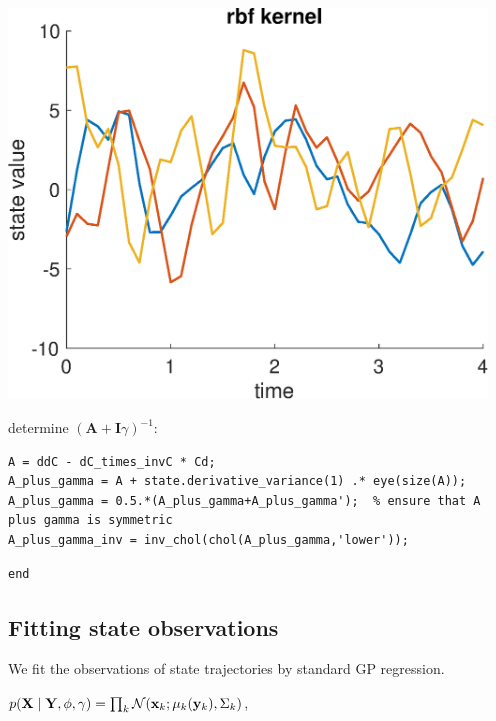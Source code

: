 \includegraphics [width=5in]{Lotka_Volterra_3_04.eps}
\begin{par}
determine $(\mathbf{A} + \mathbf{I}\gamma)^{-1}$:
\end{par} \vspace{1em}
\color{RoyalPurple}\begin{verbatim}
A = ddC - dC_times_invC * Cd;
A_plus_gamma = A + state.derivative_variance(1) .* eye(size(A));
A_plus_gamma = 0.5.*(A_plus_gamma+A_plus_gamma');  % ensure that A plus gamma is symmetric
A_plus_gamma_inv = inv_chol(chol(A_plus_gamma,'lower'));
\end{verbatim}
\color{black}
\color{RoyalPurple}\begin{verbatim}
end
\end{verbatim}
\color{black}
\begin{par}
\section{ Fitting state observations }
\end{par} \vspace{1em}
\begin{par}
We fit the observations of state trajectories by standard GP regression.
\end{par} \vspace{1em}
\begin{par}
$p(\mathbf{X} \mid \mathbf{Y}, \phi,\gamma) = \prod_k \mathcal{N}(\mathbf{x}_k ; \boldmath\mu_k(\mathbf{y}_k),\boldmath\Sigma_k)$,
\end{par} \vspace{1em}
